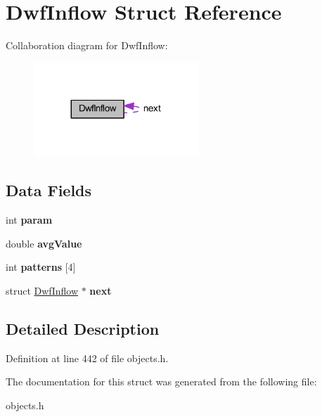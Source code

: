 \hypertarget{struct_dwf_inflow}{}\section{Dwf\+Inflow Struct Reference}
\label{struct_dwf_inflow}


Collaboration diagram for Dwf\+Inflow\+:
\nopagebreak
\begin{figure}[H]
\begin{center}
\leavevmode
\includegraphics[width=176pt]{d0/ded/struct_dwf_inflow__coll__graph}
\end{center}
\end{figure}
\subsection*{Data Fields}
\begin{DoxyCompactItemize}
\item 
\mbox{\label{struct_dwf_inflow_a1a3bcdb98792a1ce2e9c403f4b10292a}} 
int {\bfseries param}
\item 
\mbox{\label{struct_dwf_inflow_a55620b9024299a825f45f8129d7bfc01}} 
double {\bfseries avg\+Value}
\item 
\mbox{\label{struct_dwf_inflow_a5f79896c27a504fe3578e72b50ede42c}} 
int {\bfseries patterns} \mbox{[}4\mbox{]}
\item 
\mbox{\label{struct_dwf_inflow_acdf2c7978a6e1da81c63ab8e81c52dff}} 
struct \hyperlink{struct_dwf_inflow}{Dwf\+Inflow} $\ast$ {\bfseries next}
\end{DoxyCompactItemize}


\subsection{Detailed Description}


Definition at line 442 of file objects.\+h.



The documentation for this struct was generated from the following file\+:\begin{DoxyCompactItemize}
\item 
objects.\+h\end{DoxyCompactItemize}
